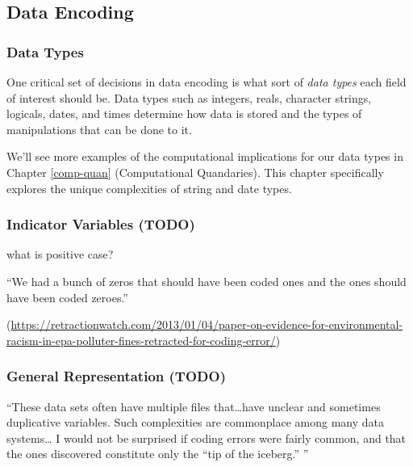 \documentclass[
]{krantz}
\renewenvironment{quote}{\begin{VF}}{\end{VF}}
\begin{document}
\hypertarget{data-encoding}{%
\subsection{Data Encoding}\label{data-encoding}}

\hypertarget{data-types}{%
\subsubsection{Data Types}\label{data-types}}

One critical set of decisions in data encoding is what sort of \emph{data types} each field of interest should be. Data types such as integers, reals, character strings, logicals, dates, and times determine how data is stored and the types of manipulations that can be done to it.

We'll see more examples of the computational implications for our data types in Chapter \ref{comp-quan} (Computational Quandaries). This chapter specifically explores the unique complexities of string and date types.

\hypertarget{indicator-variables-todo}{%
\subsubsection{Indicator Variables (TODO)}\label{indicator-variables-todo}}

what is positive case?

\begin{quote}
``We had a bunch of zeros that should have been coded ones and the ones should have been coded zeroes.''
\end{quote}

(\url{https://retractionwatch.com/2013/01/04/paper-on-evidence-for-environmental-racism-in-epa-polluter-fines-retracted-for-coding-error/})

\hypertarget{general-representation-todo}{%
\subsubsection{General Representation (TODO)}\label{general-representation-todo}}

\begin{quote}
``These data sets often have multiple files that\ldots have unclear and sometimes duplicative variables. Such complexities are commonplace among many data systems\ldots{} I would not be surprised if coding errors were fairly common, and that the ones discovered constitute only the ``tip of the iceberg.''
''
\end{quote}
\end{document}
